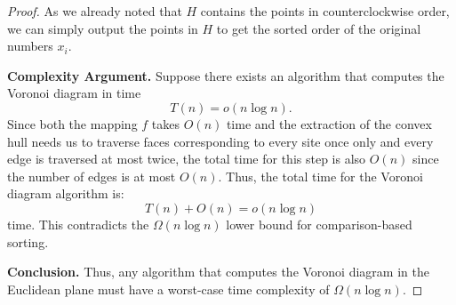 \documentclass[12pt]{article}
\begin{document}
\begin{proof}
As we already noted that \(H\) contains the points in counterclockwise order, we can simply output the points in \(H\) to get the sorted order of the original numbers \(x_i\).


\medskip
\noindent\textbf{Complexity Argument.}  
Suppose there exists an algorithm that computes the Voronoi diagram in time
\[
T(n) = o(n \log n).
\]
Since both the mapping \(f\) takes \(O(n)\) time and the extraction of the convex hull needs us to traverse faces corresponding to every site once only and every edge is traversed at most twice, the total time for this step is also \(O(n)\) since the number of edges is at most \(O(n)\). Thus, the total time for the Voronoi diagram algorithm is:
\[
T(n) + O(n) = o(n \log n)
\]
time. This contradicts the \(\Omega(n \log n)\) lower bound for comparison-based sorting.

\medskip
\noindent\textbf{Conclusion.}  
Thus, any algorithm that computes the Voronoi diagram in the Euclidean plane must have a worst-case time complexity of \(\Omega(n \log n)\).
\end{proof}
\end{document}

